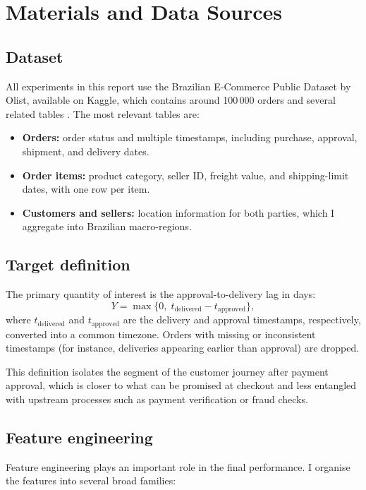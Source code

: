 \documentclass[12pt]{article}
\begin{document}
\section{Materials and Data Sources}
\subsection{Dataset}
All experiments in this report use the Brazilian E-Commerce Public Dataset by Olist, available on Kaggle, which contains around 100\,000 orders and several related tables \citep{olistdataset}. The most relevant tables are:
\begin{itemize}
  \item \textbf{Orders:} order status and multiple timestamps, including purchase, approval, shipment, and delivery dates.
  \item \textbf{Order items:} product category, seller ID, freight value, and shipping-limit dates, with one row per item.
  \item \textbf{Customers and sellers:} location information for both parties, which I aggregate into Brazilian macro-regions.
\end{itemize}

\subsection{Target definition}
The primary quantity of interest is the approval-to-delivery lag in days:
\begin{equation}
  Y = \max\bigl\{0,\; t_{\text{delivered}} - t_{\text{approved}}\bigr\},
\end{equation}
where $t_{\text{delivered}}$ and $t_{\text{approved}}$ are the delivery and approval timestamps, respectively, converted into a common timezone. Orders with missing or inconsistent timestamps (for instance, deliveries appearing earlier than approval) are dropped.

This definition isolates the segment of the customer journey after payment approval, which is closer to what can be promised at checkout and less entangled with upstream processes such as payment verification or fraud checks.

\subsection{Feature engineering}
Feature engineering plays an important role in the final performance. I organise the features into several broad families:
\end{document}
